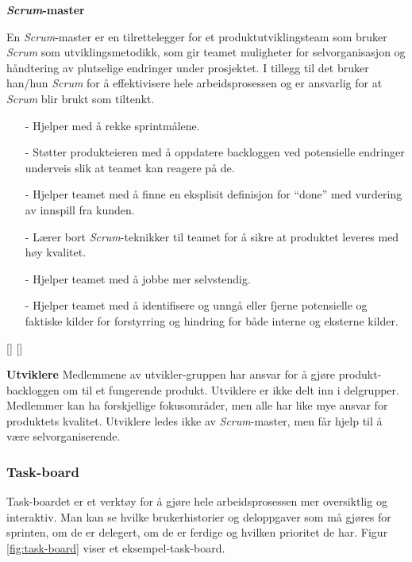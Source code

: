\documentclass[12pt,a4paper,norsk]{article}
\begin{document}
    \bigskip \noindent \textbf{\textit{Scrum}-master}
    \par En \textit{Scrum}-master er en tilrettelegger for et produktutviklingsteam som bruker \textit{Scrum} som utviklingsmetodikk, som gir teamet muligheter for selvorganisasjon og håndtering av plutselige endringer under prosjektet. I tillegg til det bruker han/hun \textit{Scrum} for å effektivisere hele arbeidsprosessen og er ansvarlig for at \textit{Scrum} blir brukt som tiltenkt.

    \begin{itemize}
    \item[-] Hjelper med å rekke sprintmålene.
    \item[-] Støtter produkteieren med å oppdatere backloggen ved potensielle endringer underveis slik at teamet kan reagere på de.
    \item[-]  Hjelper teamet med å finne en eksplisit definisjon for “done” med vurdering av innspill fra kunden.
    \item[-]  Lærer bort \textit{Scrum}-teknikker til teamet for å sikre at produktet leveres med høy kvalitet.
    \item[-]  Hjelper teamet med å jobbe mer selvstendig.
    \item[-]  Hjelper teamet med å identifisere og unngå eller fjerne             potensielle og faktiske kilder for forstyrring og hindring for både interne og eksterne kilder.
    \end{itemize}

    [\cite{scrummaster}]
    [\cite{scrummasterrolle}]

    \bigskip \noindent \textbf{Utviklere}
        Medlemmene av utvikler-gruppen har ansvar for å gjøre produkt-backloggen om til et fungerende produkt. Utviklere er ikke delt inn i delgrupper. Medlemmer kan ha forskjellige fokusområder, men alle har like mye ansvar for produktets kvalitet. Utviklere ledes ikke av \textit{Scrum}-master, men får hjelp til å være selvorganiserende.

  \subsubsection{Task-board}
  Task-boardet er et verktøy for å gjøre hele arbeidsprosessen mer oversiktlig og interaktiv. Man kan se hvilke brukerhistorier og deloppgaver som må gjøres for sprinten, om de er delegert, om de er ferdige og hvilken prioritet de har. Figur \ref{fig:task-board} viser et eksempel-task-board.
\end{document}
